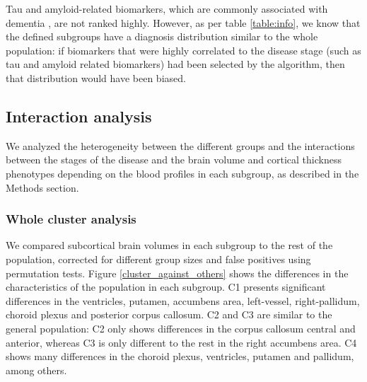 Tau and amyloid-related biomarkers, which are commonly associated with dementia \cite{Dage2016,Ovod2017,Nakamura2018}, are not ranked highly. However, as per table \ref{table:info}, we know that the defined subgroups have a diagnosis distribution similar to the whole population: if biomarkers that were highly correlated to the disease stage (such as tau and amyloid related biomarkers) had been selected by the algorithm, then that distribution would have been biased. \\

\subsection{Interaction analysis}

We analyzed the heterogeneity between the different groups and the interactions between the stages of the disease and the brain volume and cortical thickness phenotypes depending on the blood profiles in each subgroup, as described in the Methods section. \\

\subsubsection{Whole cluster analysis}

We compared subcortical brain volumes in each subgroup to the rest of the population, corrected for different group sizes and false positives using permutation tests. Figure \ref{cluster_against_others} shows the differences in the characteristics of the population in each subgroup. C1 presents significant differences in the ventricles, putamen, accumbens area, left-vessel, right-pallidum, choroid plexus and posterior corpus callosum. C2 and C3 are similar to the general population: C2 only shows differences in the corpus callosum central and anterior, whereas C3 is only different to the rest in the right accumbens area. C4 shows many differences in the choroid plexus, ventricles, putamen and pallidum, among others.

